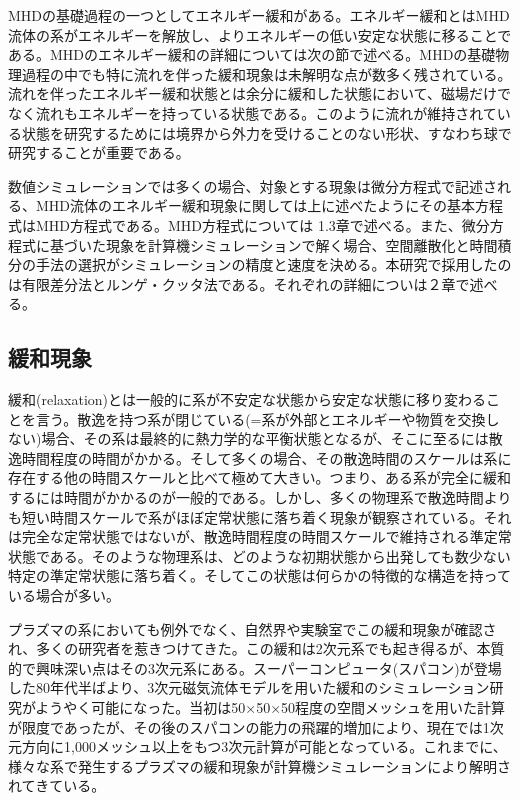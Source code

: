 \documentclass[12pt]{jsarticle}
\begin{document}
MHDの基礎過程の一つとしてエネルギー緩和がある。エネルギー緩和とはMHD流体の系がエネルギーを解放し、よりエネルギーの低い安定な状態に移ることである。MHDのエネルギー緩和の詳細については次の節で述べる。MHDの基礎物理過程の中でも特に流れを伴った緩和現象は未解明な点が数多く残されている。流れを伴ったエネルギー緩和状態とは余分に緩和した状態において、磁場だけでなく流れもエネルギーを持っている状態である。このように流れが維持されている状態を研究するためには境界から外力を受けることのない形状、すなわち球で研究することが重要である。


数値シミュレーションでは多くの場合、対象とする現象は微分方程式で記述される、MHD流体のエネルギー緩和現象に関しては上に述べたようにその基本方程式はMHD方程式である。MHD方程式については 1.3章で述べる。また、微分方程式に基づいた現象を計算機シミュレーションで解く場合、空間離散化と時間積分の手法の選択がシミュレーションの精度と速度を決める。本研究で採用したのは有限差分法とルンゲ・クッタ法である。それぞれの詳細についは２章で述べる。


\subsection{緩和現象}
緩和(relaxation)とは一般的に系が不安定な状態から安定な状態に移り変わることを言う。散逸を持つ系が閉じている(=系が外部とエネルギーや物質を交換しない)場合、その系は最終的に熱力学的な平衡状態となるが、そこに至るには散逸時間程度の時間がかかる。そして多くの場合、その散逸時間のスケールは系に存在する他の時間スケールと比べて極めて大きい。つまり、ある系が完全に緩和するには時間がかかるのが一般的である。しかし、多くの物理系で散逸時間よりも短い時間スケールで系がほぼ定常状態に落ち着く現象が観察されている。それは完全な定常状態ではないが、散逸時間程度の時間スケールで維持される準定常状態である。そのような物理系は、どのような初期状態から出発しても数少ない特定の準定常状態に落ち着く。そしてこの状態は何らかの特徴的な構造を持っている場合が多い。

プラズマの系においても例外でなく、自然界や実験室でこの緩和現象が確認され、多くの研究者を惹きつけてきた。この緩和は2次元系でも起き得るが、本質的で興味深い点はその3次元系にある。スーパーコンピュータ(スパコン)が登場した80年代半ばより、3次元磁気流体モデルを用いた緩和のシミュレーション研究がようやく可能になった。当初は50×50×50程度の空間メッシュを用いた計算が限度であったが、その後のスパコンの能力の飛躍的増加により、現在では1次元方向に1,000メッシュ以上をもつ3次元計算が可能となっている。これまでに、様々な系で発生するプラズマの緩和現象が計算機シミュレーションにより解明されてきている\cite{プラズマ核融合シミュレーションの発展と将来への期待}。
\end{document}
